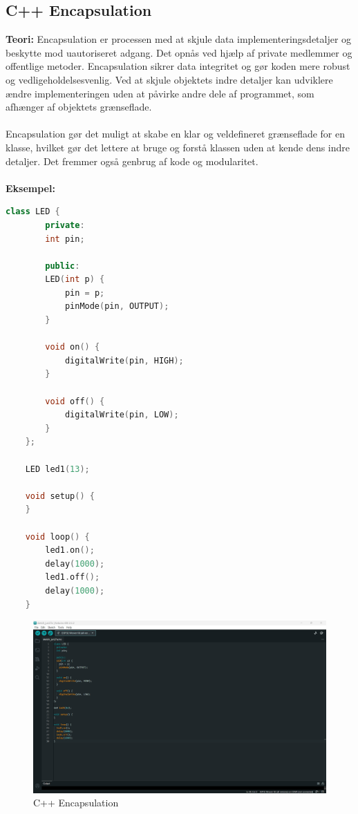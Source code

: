 \subsection{C++ Encapsulation}
\textbf{Teori:} Encapsulation er processen med at skjule data implementeringsdetaljer og beskytte mod uautoriseret adgang. Det opnås ved hjælp af private medlemmer og offentlige metoder. Encapsulation sikrer data integritet og gør koden mere robust og vedligeholdelsesvenlig. Ved at skjule objektets indre detaljer kan udviklere ændre implementeringen uden at påvirke andre dele af programmet, som afhænger af objektets grænseflade.
\\\\
\noindent Encapsulation gør det muligt at skabe en klar og veldefineret grænseflade for en klasse, hvilket gør det lettere at bruge og forstå klassen uden at kende dens indre detaljer. Det fremmer også genbrug af kode og modularitet.
\\\\
\noindent\noindent\textbf{Eksempel:}
\begin{lstlisting}[language=C++]
	class LED {
		private:
		int pin;
		
		public:
		LED(int p) {
			pin = p;
			pinMode(pin, OUTPUT);
		}
		
		void on() {
			digitalWrite(pin, HIGH);
		}
		
		void off() {
			digitalWrite(pin, LOW);
		}
	};
	
	LED led1(13);
	
	void setup() {
	}
	
	void loop() {
		led1.on();
		delay(1000);
		led1.off();
		delay(1000);
	}
\end{lstlisting}
\begin{figure}[h!]
	\centering
	\includegraphics[width=\textwidth]{fig/fig15.png}
	\caption{C++ Encapsulation}
	\label{fig:15}
\end{figure}

